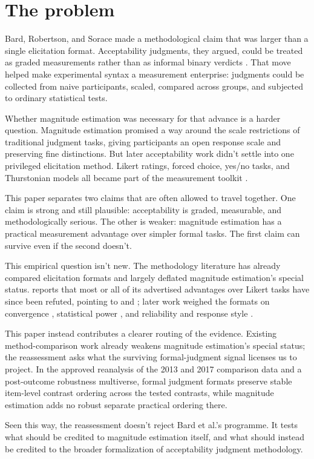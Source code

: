 \section{The problem}

Bard, Robertson, and Sorace made a methodological claim that was larger than a
single elicitation format. Acceptability judgments, they argued, could be
treated as graded measurements rather than as informal binary verdicts
\citep{BardEtAl1996}. That move helped make experimental syntax a
measurement enterprise: judgments could be collected from naive participants,
scaled, compared across groups, and subjected to ordinary statistical tests.

Whether magnitude estimation was necessary for that advance is a harder
question.
Magnitude estimation promised a way around the scale restrictions of
traditional judgment tasks, giving participants an open response scale and
preserving fine distinctions. But later acceptability work didn't settle into
one privileged elicitation method. Likert ratings, forced choice, yes/no tasks,
and Thurstonian models all became part of the measurement toolkit
\citep{sprouse2013,LangsfordEtAl2018,sprouse2017}.

This paper separates two claims that are often allowed to travel together. One
claim is strong and still plausible: acceptability is graded, measurable, and
methodologically serious. The other is weaker: magnitude estimation has a
practical measurement advantage over simpler formal tasks. The first claim can
survive even if the second doesn't.

This empirical question isn't new. The methodology literature has already
compared elicitation formats and largely deflated magnitude
estimation's special status. \textcite{schutze2016} reports that most or all of
its advertised advantages over Likert tasks have since been refuted, pointing to
\textcite{weskott2011} and \textcite{sprouse2013}; later work weighed the formats
on convergence \citep{sprouse2013}, statistical power \citep{sprouse2017},
and reliability and response style \citep{LangsfordEtAl2018}.

This paper instead contributes a clearer routing of the evidence. Existing
method-comparison work already weakens magnitude estimation's special status;
the reassessment asks what the
surviving formal-judgment signal licenses us to project. In the approved
reanalysis of the 2013 and 2017 comparison data and a post-outcome robustness
multiverse, formal judgment
formats preserve stable item-level contrast ordering across the tested
contrasts, while magnitude estimation adds no robust separate practical
ordering there.

Seen this way, the reassessment doesn't reject Bard et al.'s programme. It
tests what should be credited to magnitude estimation itself, and what
should instead be credited to the broader formalization of acceptability
judgment methodology.
